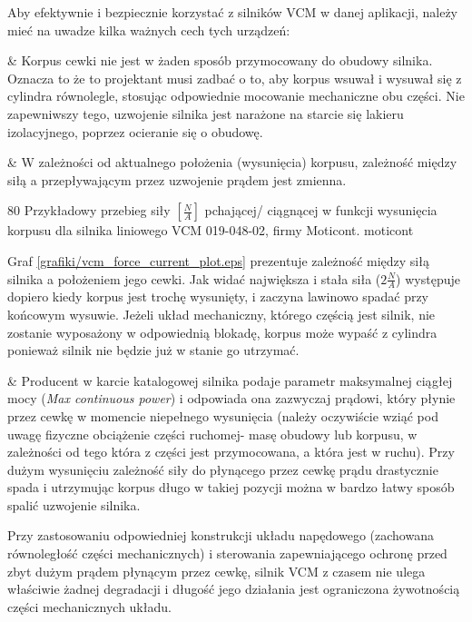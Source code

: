 Aby efektywnie i bezpiecznie korzystać z silników VCM w danej aplikacji, należy mieć na uwadze kilka ważnych cech tych urządzeń:

\begin{easylist}
	& Korpus cewki nie jest w żaden sposób przymocowany do obudowy silnika. Oznacza to że to projektant musi zadbać o to, aby korpus wsuwał i wysuwał się z cylindra równolegle, stosując odpowiednie mocowanie mechaniczne obu części. Nie zapewniwszy tego, uzwojenie silnika jest narażone na starcie się lakieru izolacyjnego, poprzez ocieranie się o obudowę. 
	
	& W zależności od aktualnego położenia (wysunięcia) korpusu, zależność między siłą a przepływającym przez uzwojenie prądem jest zmienna.
	
		{80}
		{Przykładowy przebieg siły $ [\frac{N}{A}] $ pchającej/ ciągnącej w funkcji wysunięcia korpusu dla silnika liniowego VCM 019-048-02, firmy Moticont.}
		{moticont}
	
Graf \ref{grafiki/vcm_force_current_plot.eps} prezentuje zależność między siłą silnika a położeniem jego cewki. Jak widać największa i stała siła ($ 2 \frac{N}{A} $) występuje dopiero kiedy korpus jest trochę wysunięty, i zaczyna lawinowo spadać przy końcowym wysuwie. Jeżeli układ mechaniczny, którego częścią jest silnik, nie zostanie wyposażony w odpowiednią blokadę, korpus może wypaść z cylindra ponieważ silnik nie będzie już w stanie go utrzymać.

	& Producent w karcie katalogowej silnika podaje parametr maksymalnej ciągłej mocy ({\em Max continuous power}) i odpowiada ona zazwyczaj prądowi, który płynie przez cewkę w momencie niepełnego wysunięcia (należy oczywiście wziąć pod uwagę fizyczne obciążenie części ruchomej- masę obudowy lub korpusu, w zależności od tego która z części jest przymocowana, a która jest w ruchu). Przy dużym wysunięciu zależność siły do płynącego przez cewkę prądu drastycznie spada i utrzymując korpus długo w takiej pozycji można w bardzo łatwy sposób spalić uzwojenie silnika. \\
	
\end{easylist}

Przy zastosowaniu odpowiedniej konstrukcji układu napędowego (zachowana równoległość części mechanicznych) i sterowania zapewniającego ochronę przed zbyt dużym prądem płynącym przez cewkę, silnik VCM z czasem nie ulega właściwie żadnej degradacji i długość jego działania jest ograniczona żywotnością części mechanicznych układu.









